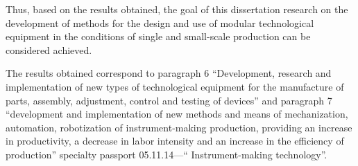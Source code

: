 Thus, based on the results obtained, the goal of this dissertation research on the development of methods for the design and use of modular technological equipment in the conditions of single and small-scale production can be considered achieved.

The results obtained correspond to paragraph 6 ``Development, research and implementation of new types of technological equipment for the manufacture of parts, assembly, adjustment, control and testing of devices'' and paragraph 7 ``development and implementation of new methods and means of mechanization, automation, robotization of instrument-making production, providing an increase in productivity, a decrease in labor intensity and an increase in the efficiency of production'' specialty passport 05.11.14---`` Instrument-making technology''.
